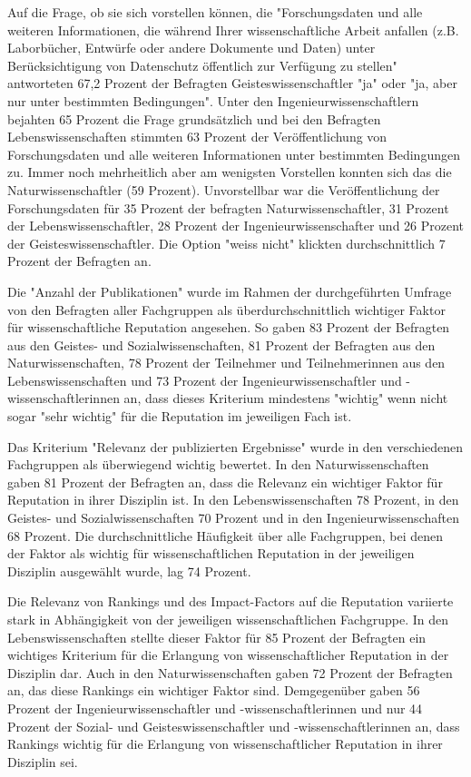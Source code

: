 Auf die Frage, ob sie sich vorstellen können, die "Forschungsdaten und alle weiteren Informationen, die während Ihrer wissenschaftliche Arbeit anfallen (z.B. Laborbücher, Entwürfe oder andere Dokumente und Daten) unter Berücksichtigung von Datenschutz öffentlich zur Verfügung zu stellen" antworteten 67,2 Prozent der Befragten Geisteswissenschaftler "ja" oder "ja, aber nur unter bestimmten Bedingungen". Unter den Ingenieurwissenschaftlern bejahten 65 Prozent die Frage grundsätzlich und bei den Befragten Lebenswissenschaften stimmten 63 Prozent der Veröffentlichung von Forschungsdaten und alle weiteren Informationen unter bestimmten Bedingungen zu. Immer noch mehrheitlich aber am wenigsten Vorstellen konnten sich das die Naturwissenschaftler (59 Prozent). Unvorstellbar war die Veröffentlichung der Forschungsdaten für 35 Prozent der befragten Naturwissenschaftler, 31 Prozent der Lebenswissenschaftler, 28 Prozent der Ingenieurwissenschafter und 26 Prozent der Geisteswissenschaftler. Die Option "weiss nicht" klickten durchschnittlich 7 Prozent der Befragten an.

Die "Anzahl der Publikationen" wurde im Rahmen der durchgeführten Umfrage von den Befragten aller Fachgruppen als überdurchschnittlich wichtiger Faktor für wissenschaftliche Reputation angesehen. So gaben 83 Prozent der Befragten aus den Geistes- und Sozialwissenschaften, 81 Prozent der Befragten aus den Naturwissenschaften, 78 Prozent der Teilnehmer und Teilnehmerinnen aus den Lebenswissenschaften und 73 Prozent der Ingenieurwissenschaftler und -wissenschaftlerinnen an, dass dieses Kriterium mindestens "wichtig" wenn nicht sogar "sehr wichtig" für die Reputation im jeweiligen Fach ist.

Das Kriterium "Relevanz der publizierten Ergebnisse" wurde in den verschiedenen Fachgruppen als überwiegend wichtig bewertet. In den Naturwissenschaften gaben 81 Prozent der Befragten an, dass die Relevanz ein wichtiger Faktor für Reputation in ihrer Disziplin ist. In den Lebenswissenschaften 78 Prozent, in den Geistes- und Sozialwissenschaften 70 Prozent und in den Ingenieurwissenschaften 68 Prozent. Die durchschnittliche Häufigkeit über alle Fachgruppen, bei denen der Faktor als wichtig für wissenschaftlichen Reputation in der jeweiligen Disziplin ausgewählt wurde, lag 74 Prozent.

Die Relevanz von Rankings und des Impact-Factors auf die Reputation variierte stark in Abhängigkeit von der jeweiligen wissenschaftlichen Fachgruppe. In den Lebenswissenschaften stellte dieser Faktor für 85 Prozent der Befragten ein wichtiges Kriterium für die Erlangung von wissenschaftlicher Reputation in der Disziplin dar. Auch in den Naturwissenschaften gaben 72 Prozent der Befragten an, das diese Rankings ein wichtiger Faktor sind. Demgegenüber gaben 56 Prozent der Ingenieurwissenschaftler und -wissenschaftlerinnen und nur 44 Prozent der Sozial- und Geisteswissenschaftler und -wissenschaftlerinnen an, dass Rankings wichtig für die Erlangung von wissenschaftlicher Reputation in ihrer Disziplin sei.

